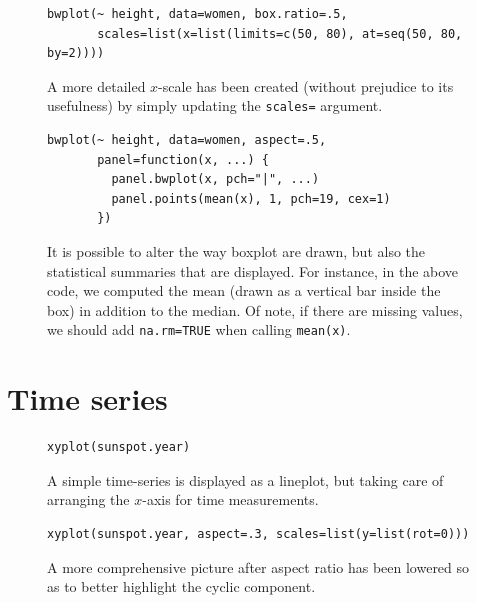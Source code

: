 \documentclass[a4paper,twoside]{book}
\newcounter{fig}
\newcommand{\img}[1]{\texttt{[image: \#1]}\stepcounter{fig}}
\renewcommand{\texttt}[1]{\lstinline{#1}}
\begin{document}
\begin{figure}[H]
\begin{lstlisting}
bwplot(~ height, data=women, box.ratio=.5,
       scales=list(x=list(limits=c(50, 80), at=seq(50, 80, by=2))))
\end{lstlisting}
  \fcapside[\FBwidth] {\img{figs_lattice-crop}} {\caption*{A more
      detailed $x$-scale has been created (without prejudice to its
      usefulness) by simply updating the \texttt{scales=} argument.}}
\end{figure}

\begin{figure}[H]
\begin{lstlisting}
bwplot(~ height, data=women, aspect=.5, 
       panel=function(x, ...) {
         panel.bwplot(x, pch="|", ...)
         panel.points(mean(x), 1, pch=19, cex=1)
       })
\end{lstlisting}
  \fcapside[\FBwidth] {\img{figs_lattice-crop}} {\caption*{It is
      possible to alter the way boxplot are drawn, but also the
      statistical summaries that are displayed. For instance, in the
      above code, we computed the mean (drawn as a vertical bar inside
      the box) in addition to the median. Of note, if there are
      missing values, we should add \texttt{na.rm=TRUE} when calling
      \texttt{mean(x)}.}}
\end{figure}

\section{Time series}
\lipsum[1]

\begin{figure}[H]
\begin{lstlisting}
xyplot(sunspot.year)
\end{lstlisting}
  \fcapside[\FBwidth] {\img{figs_lattice-crop}}
  {\caption*{ A simple time-series is displayed
      as a lineplot, but taking care of arranging the $x$-axis for
      time measurements.}}
\end{figure}

\begin{figure}[H]
\begin{lstlisting}
xyplot(sunspot.year, aspect=.3, scales=list(y=list(rot=0)))
\end{lstlisting}
  \fcapside[\FBwidth] {\img{figs_lattice-crop}} {\caption*{A more
      comprehensive picture after aspect ratio has been lowered so as
      to better highlight the cyclic component.}}
\end{figure}
\end{document}
